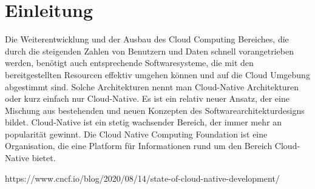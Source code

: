 \chapter{Einleitung}

Die Weiterentwicklung und der Ausbau des Cloud Computing Bereiches, die durch die steigenden Zahlen von Benutzern und Daten schnell vorangetrieben werden, benötigt auch entsprechende Softwaresysteme, die mit den bereitgestellten Resourcen effektiv umgehen können und auf die Cloud Umgebung abgestimmt sind.
Solche Architekturen nennt man Cloud-Native Architekturen oder kurz einfach nur Cloud-Native. Es ist ein relativ neuer Ansatz, der eine Mischung aus bestehenden und neuen Konzepten des Softwarearchitekturdesigns bildet.
Cloud-Native ist ein stetig wachsender Bereich, der immer mehr an popularität gewinnt.
Die Cloud Native Computing Foundation ist eine Organisation, die eine Platform für Informationen rund um den Bereich Cloud-Native bietet.

https://www.cncf.io/blog/2020/08/14/state-of-cloud-native-development/